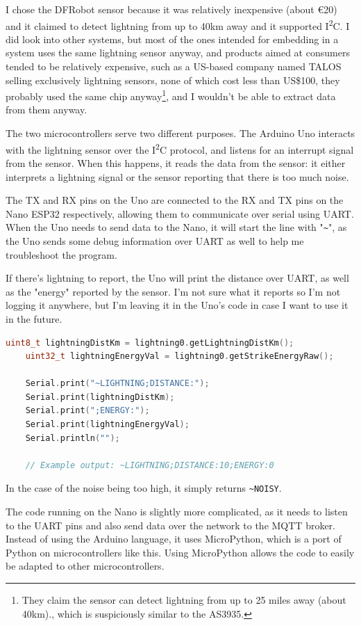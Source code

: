 I chose the DFRobot sensor because it was relatively inexpensive (about €20) and it claimed to detect lightning from up to 40km away and it supported I\textsuperscript{2}C. I did look into other systems, but most of the ones intended for embedding in a system uses the same lightning sensor anyway, and products aimed at consumers tended to be relatively expensive, such as a US-based company named TALOS selling exclusively lightning sensors, none of which cost less than US\$100, they probably used the same chip anyway\footnote{They claim the sensor can detect lightning from up to 25 miles away (about 40km).\cite{talos}, which is suspiciously similar to the AS3935.}, and I wouldn't be able to extract data from them anyway.

The two microcontrollers serve two different purposes. The Arduino Uno interacts with the lightning sensor over the I\textsuperscript{2}C protocol, and listens for an interrupt signal from the sensor. When this happens, it reads the data from the sensor: it either interprets a lightning signal or the sensor reporting that there is too much noise.

The TX and RX pins on the Uno are connected to the RX and TX pins on the Nano ESP32 respectively, allowing them to communicate over serial using UART. When the Uno needs to send data to the Nano, it will start the line with "\texttt{\~{}}", as the Uno sends some debug information over UART as well to help me troubleshoot the program.

If there's lightning to report, the Uno will print the distance over UART, as well as the "energy" reported by the sensor. I'm not sure what it reports so I'm not logging it anywhere, but I'm leaving it in the Uno's code in case I want to use it in the future. 

\begin{lstlisting}[language=c++]
	uint8_t lightningDistKm = lightning0.getLightningDistKm();
	uint32_t lightningEnergyVal = lightning0.getStrikeEnergyRaw();
	
	Serial.print("~LIGHTNING;DISTANCE:");
	Serial.print(lightningDistKm);
	Serial.print(";ENERGY:");
	Serial.print(lightningEnergyVal);
	Serial.println("");
	
	// Example output: ~LIGHTNING;DISTANCE:10;ENERGY:0
\end{lstlisting}

In the case of the noise being too high, it simply returns \texttt{\~{}NOISY}.

The code running on the Nano is slightly more complicated, as it needs to listen to the UART pins and also send data over the network to the MQTT broker. Instead of using the Arduino language, it uses MicroPython, which is a port of Python on microcontrollers like this. Using MicroPython allows the code to easily be adapted to other microcontrollers.


